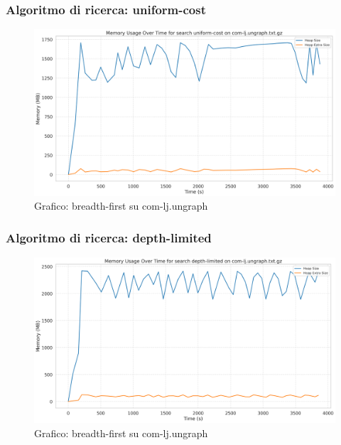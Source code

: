 \documentclass{article}
\begin{document}
\subsubsection{Algoritmo di ricerca: uniform-cost}
\begin{figure}[h]\centering
	\includegraphics[width=\textwidth]{../plots/com-lj.ungraph_uniform-cost.png}
	\caption{Grafico: breadth-first su com-lj.ungraph}
\end{figure}
\subsubsection{Algoritmo di ricerca: depth-limited}
\begin{figure}[h]\centering
	\includegraphics[width=\textwidth]{../plots/com-lj.ungraph_depth-limited.png}
	\caption{Grafico: breadth-first su com-lj.ungraph}
\end{figure}
\end{document}
